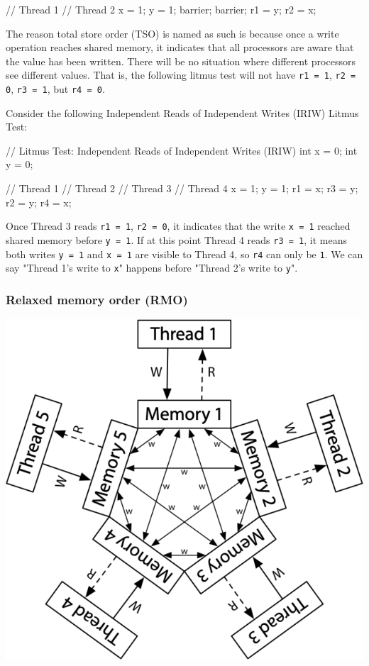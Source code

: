 \documentclass[fontsize=10pt, oneside]{scrartcl}
\newcommand{\monobox}[1]{\mbox{\texttt{#1}}}
\begin{document}
\begin{ccode}
// Thread 1           // Thread 2
x = 1;                y = 1;
barrier;              barrier;
r1 = y;               r2 = x;
\end{ccode}

The reason total store order (TSO) is named as such is because once a write operation reaches shared memory, it indicates that all processors are aware that the value has been written.
There will be no situation where different processors see different values.
That is, the following litmus test will not have \monobox{r1 = 1}, \monobox{r2 = 0}, \monobox{r3 = 1}, but \monobox{r4 = 0}.

Consider the following Independent Reads of Independent Writes (IRIW) Litmus Test:

\begin{ccode}
// Litmus Test: Independent Reads of Independent Writes (IRIW)
int x = 0;
int y = 0;

// Thread 1    // Thread 2    // Thread 3    // Thread 4
x = 1;         y = 1;         r1 = x;        r3 = y;
                              r2 = y;        r4 = x;
\end{ccode}

Once Thread 3 reads \monobox{r1 = 1}, \monobox{r2 = 0}, it indicates that the write \monobox{x = 1} reached shared memory before \monobox{y = 1}.
If at this point Thread 4 reads \monobox{r3 = 1}, it means both writes \monobox{y = 1} and \monobox{x = 1} are visible to Thread 4, so \monobox{r4} can only be \monobox{1}.
We can say "Thread 1's write to \monobox{x}" happens before "Thread 2's write to \monobox{y}".

\subsubsection{Relaxed memory order (RMO)}

\begin{center}
\includegraphics[keepaspectratio,width=0.4\linewidth]{images/hw-relaxed}
\label{hw-relaxed}
\end{center}
\end{document}
